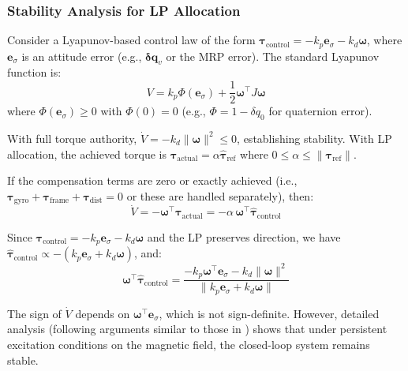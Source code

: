 \documentclass[conference]{IEEEtran}
\begin{document}
\subsubsection{Stability Analysis for LP Allocation}
Consider a Lyapunov-based control law of the form $\boldsymbol{\tau}_{\text{control}} = -k_p \mathbf{e}_\sigma - k_d \boldsymbol{\omega}$, where $\mathbf{e}_\sigma$ is an attitude error (e.g., $\mathbf{\delta q}_v$ or the MRP error). The standard Lyapunov function is:
\begin{equation}
V = k_p \Phi(\mathbf{e}_\sigma) + \frac{1}{2} \boldsymbol{\omega}^\top J \boldsymbol{\omega}
\end{equation}
where $\Phi(\mathbf{e}_\sigma) \geq 0$ with $\Phi(0) = 0$ (e.g., $\Phi = 1 - \delta q_0$ for quaternion error).

With full torque authority, $\dot{V} = -k_d \|\boldsymbol{\omega}\|^2 \leq 0$, establishing stability. With LP allocation, the achieved torque is $\boldsymbol{\tau}_{\text{actual}} = \alpha \hat{\boldsymbol{\tau}}_{\text{ref}}$ where $0 \leq \alpha \leq \|\boldsymbol{\tau}_{\text{ref}}\|$.

If the compensation terms are zero or exactly achieved (i.e., $\boldsymbol{\tau}_{\text{gyro}} + \boldsymbol{\tau}_{\text{frame}} + \boldsymbol{\tau}_{\text{dist}} = 0$ or these are handled separately), then:
\begin{equation}
\dot{V} = -\boldsymbol{\omega}^\top \boldsymbol{\tau}_{\text{actual}} = -\alpha \, \boldsymbol{\omega}^\top \hat{\boldsymbol{\tau}}_{\text{control}}
\end{equation}

Since $\boldsymbol{\tau}_{\text{control}} = -k_p \mathbf{e}_\sigma - k_d \boldsymbol{\omega}$ and the LP preserves direction, we have $\hat{\boldsymbol{\tau}}_{\text{control}} \propto -(k_p \mathbf{e}_\sigma + k_d \boldsymbol{\omega})$, and:
\begin{equation}
\boldsymbol{\omega}^\top \hat{\boldsymbol{\tau}}_{\text{control}} = \frac{-k_p \boldsymbol{\omega}^\top \mathbf{e}_\sigma - k_d \|\boldsymbol{\omega}\|^2}{\|k_p \mathbf{e}_\sigma + k_d \boldsymbol{\omega}\|}
\end{equation}

The sign of $\dot{V}$ depends on $\boldsymbol{\omega}^\top \mathbf{e}_\sigma$, which is not sign-definite. However, detailed analysis (following arguments similar to those in \cite{lovera_global_2005}) shows that under persistent excitation conditions on the magnetic field, the closed-loop system remains stable.
\end{document}
